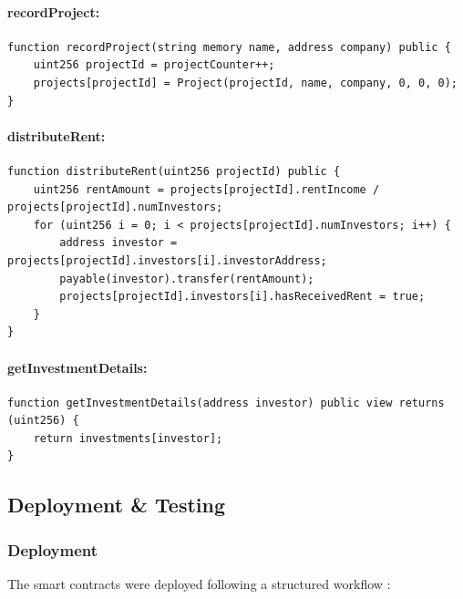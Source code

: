 \paragraph{recordProject:}
\begin{verbatim}
function recordProject(string memory name, address company) public {
    uint256 projectId = projectCounter++;
    projects[projectId] = Project(projectId, name, company, 0, 0, 0);
}
\end{verbatim}

\paragraph{distributeRent:}
\begin{verbatim}
function distributeRent(uint256 projectId) public {
    uint256 rentAmount = projects[projectId].rentIncome / projects[projectId].numInvestors;
    for (uint256 i = 0; i < projects[projectId].numInvestors; i++) {
        address investor = projects[projectId].investors[i].investorAddress;
        payable(investor).transfer(rentAmount);
        projects[projectId].investors[i].hasReceivedRent = true;
    }
}
\end{verbatim}

\paragraph{getInvestmentDetails:}
\begin{verbatim}
function getInvestmentDetails(address investor) public view returns (uint256) {
    return investments[investor];
}
\end{verbatim}

\subsection{Deployment \& Testing}

\subsubsection{Deployment}

The smart contracts were deployed following a structured workflow \cite{Wust2018BlockchainNeed}:

